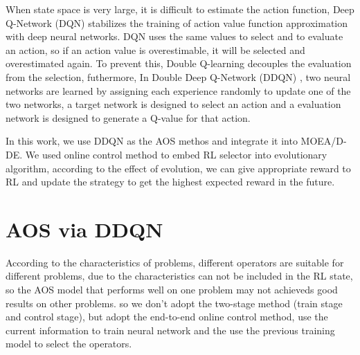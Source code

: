 \documentclass[journal]{IEEEtran}
\begin{document}
When state space is very large, it is difficult to estimate the action function, Deep Q-Network (DQN) \cite{mnih2015human} stabilizes the training of action value function approximation with deep neural networks.
DQN uses the same values to select and to evaluate an action, so if an action value is overestimable, it will be selected and overestimated again. To prevent this, Double Q-learning \cite{hasselt2010double} decouples the evaluation from the selection, futhermore, In Double Deep Q-Network (DDQN) \cite{ddqn}, two neural networks are learned by assigning each experience randomly to update one of the two networks, a target network is designed to select an action and a evaluation network is designed to generate a Q-value for that action.

In this work, we use DDQN as the AOS methos and integrate it into MOEA/D-DE.
We used online control method to embed RL selector into evolutionary algorithm,
according to the effect of evolution, we can give appropriate reward to RL and update the strategy to get the highest expected reward in the future.



\section{AOS via DDQN}
% 
According to the characteristics of problems, different operators are suitable for different problems, due to the characteristics can not be included in the RL state, so the AOS model that performs well on one problem may not achieveds good results on other problems.
so we don't adopt the two-stage method (train stage and control stage), but adopt the end-to-end online control method, use the current information to train neural network and the use the previous training model to select the operators.
\end{document}
